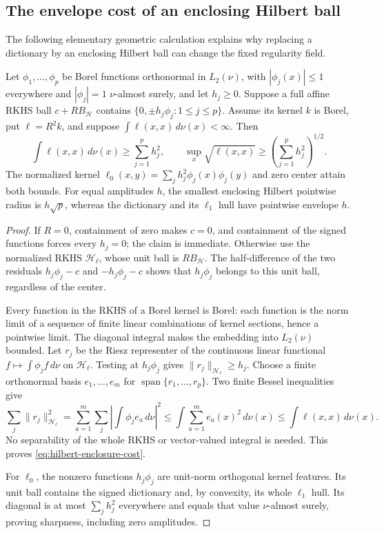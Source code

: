\subsection{The envelope cost of an enclosing Hilbert ball}

The following elementary geometric calculation explains why replacing
a dictionary by an enclosing Hilbert ball can change the fixed
regularity field.
\begin{lemma}
\label{lem:hilbert-enclosure}
Let $\phi_1,\ldots,\phi_p$ be Borel functions orthonormal in
$L_2(\nu)$, with $|\phi_j(x)|\le1$ everywhere and
$|\phi_j|=1$ $\nu$-almost surely, and let $h_j\ge0$.
Suppose a full affine RKHS ball $c+RB_{\mathcal H}$ contains
$\{0,\pm h_j\phi_j:1\le j\le p\}$.
Assume its kernel $k$ is Borel, put $\ell=R^2k$, and suppose
$\int\ell(x,x)\,d\nu(x)<\infty$. Then
\begin{equation}
 \int\ell(x,x)\,d\nu(x)\ge\sum_{j=1}^p h_j^2,\qquad
 \sup_x\sqrt{\ell(x,x)}\ge
       \left(\sum_{j=1}^ph_j^2\right)^{1/2}.
 \label{eq:hilbert-enclosure-cost}
\end{equation}
The normalized kernel
$\ell_0(x,y)=\sum_jh_j^2\phi_j(x)\phi_j(y)$ and zero center attain
both bounds. For equal amplitudes $h$, the smallest enclosing Hilbert
pointwise radius is $h\sqrt p$, whereas the dictionary and its
$\ell_1$ hull have pointwise envelope $h$.
\end{lemma}

\begin{proof}
If $R=0$, containment of zero makes $c=0$, and containment of the
signed functions forces every $h_j=0$; the claim is immediate.
Otherwise use the normalized RKHS $\mathcal H_\ell$, whose unit
ball is $RB_{\mathcal H}$. The half-difference of the two residuals
$h_j\phi_j-c$ and $-h_j\phi_j-c$ shows that
$h_j\phi_j$ belongs to this unit ball, regardless of the center.

Every function in the RKHS of a Borel kernel is Borel: each function
is the norm limit of a sequence of finite linear combinations of
kernel sections, hence a pointwise limit. The diagonal integral
makes the embedding into $L_2(\nu)$ bounded. Let $r_j$ be the Riesz
representer of the continuous linear functional
$f\mapsto\int\phi_j f\,d\nu$ on $\mathcal H_\ell$. Testing at
$h_j\phi_j$ gives $\|r_j\|_{\mathcal H_\ell}\ge h_j$.
Choose a finite orthonormal basis $e_1,\ldots,e_m$ for
$\operatorname{span}\{r_1,\ldots,r_p\}$. Two finite Bessel inequalities
give
\[
 \sum_j\|r_j\|_{\mathcal H_\ell}^2
 =\sum_{a=1}^m\sum_j\left|\int\phi_j e_a\,d\nu\right|^2
 \le\int\sum_{a=1}^m e_a(x)^2\,d\nu(x)
 \le\int\ell(x,x)\,d\nu(x).
\]
No separability of the whole RKHS or vector-valued integral is needed.
This proves \eqref{eq:hilbert-enclosure-cost}.

For $\ell_0$, the nonzero functions $h_j\phi_j$ are unit-norm
orthogonal kernel features. Its unit ball contains the signed
dictionary and, by convexity, its whole $\ell_1$ hull.
Its diagonal is at most $\sum_jh_j^2$ everywhere and equals that
value $\nu$-almost surely, proving sharpness, including zero amplitudes.
\end{proof}

